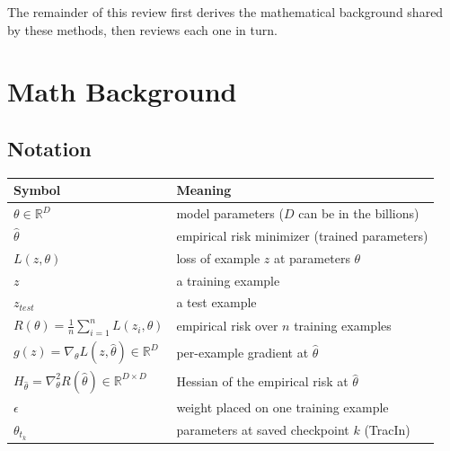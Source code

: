 \documentclass{article}
\newcommand{\hth}{\hat{\theta}}                 %
\newcommand{\Hh}{H_{\hat{\theta}}}              %
\newcommand{\gr}[1]{g(#1)}                      %
\begin{document}
The remainder of this review first derives the mathematical background shared by these methods, then reviews each one in turn.


\section{Math Background}\label{sec:math}

\subsection{Notation}
\begin{center}
    \begin{tabular}{@{}ll@{}}
        \toprule
        Symbol                                                              & Meaning                                            \\
        \midrule
        $\theta\in\mathbb{R}^{D}$                                           & model parameters ($D$ can be in the billions)      \\
        $\hth$                                                              & empirical risk minimizer (trained parameters)      \\
        $L(z,\theta)$                                                       & loss of example $z$ at parameters $\theta$         \\
        $z$                                                                 & a training example                                 \\
        $z_{test}$                                                          & a test example                                     \\
        $R(\theta)=\frac{1}{n}\sum_{i=1}^{n}L(z_i,\theta)$                  & empirical risk over $n$ training examples          \\
        $\gr{z}=\nabla_\theta L(z,\hth)\in\mathbb{R}^{D}$                   & per-example gradient at $\hth$                     \\
        $\Hh=\nabla^2_\theta R(\hth)\in\mathbb{R}^{D\times D}$              & Hessian of the empirical risk at $\hth$            \\
        $\epsilon$                                                          & weight placed on one training example              \\
        $\theta_{t_k}$                                                      & parameters at saved checkpoint $k$ (TracIn)        \\

\end{tabular}
\end{center}
\end{document}
